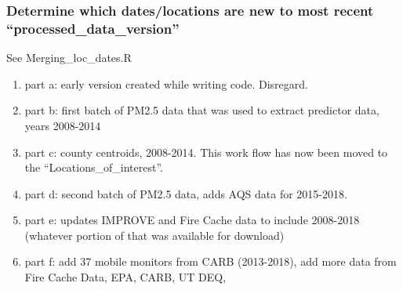 \begin{enumerate}[nolistsep]



\end{enumerate}

\subsubsection{Determine which dates/locations are new to most recent ``processed\_data\_version'' }

See Merging\_loc\_dates.R


\begin{enumerate}[nolistsep]
\item part a: early version created while writing code. Disregard.
\item part b: first batch of PM2.5 data that was used to extract predictor data, years 2008-2014
\item part c: county centroids, 2008-2014. This work flow has now been moved to the ``Locations\_of\_interest''.
\item part d: second batch of PM2.5 data, adds AQS data for 2015-2018.
\item part e: updates IMPROVE and Fire Cache data to include 2008-2018 (whatever portion of that was available for download)
\item part f: add 37 mobile monitors from CARB (2013-2018), add more data from Fire Cache Data, EPA, CARB, UT DEQ, %
\end{enumerate}

